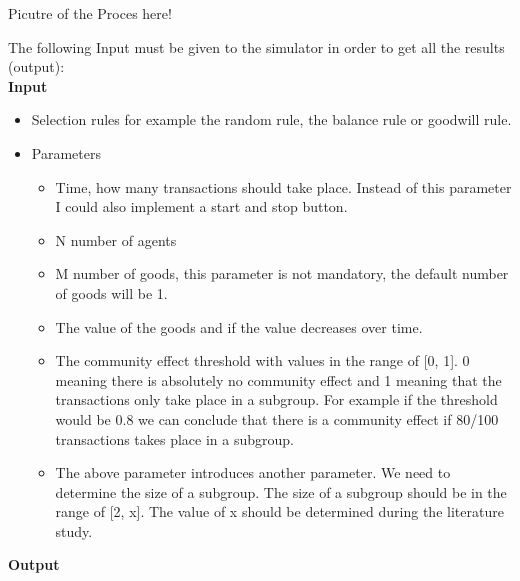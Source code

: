 \documentclass{article}
\begin{document}
Picutre of the Proces here!


The following Input must be given to the simulator in order to get all the results (output): 
\\
\textbf{Input}

\begin{itemize}
  \item Selection rules for example the random rule, the balance rule or goodwill rule.
  \item Parameters
	\begin{itemize}
 		 \item Time, how many transactions should take place. Instead of this parameter I could also implement a start and stop button.
  		\item N number of agents
  		\item M number of goods, this parameter is not mandatory, the default number of goods will be 1.
		\item The value of the goods and if the value decreases over time.
		\item The community effect threshold with values in the range of [0, 1]. 0 meaning there is absolutely no community effect and 1 meaning that the transactions only take place in a subgroup. For example if the threshold would be 0.8 we can conclude that there is a community effect if 80/100 transactions takes place in a subgroup.
		\item The above parameter introduces another parameter. We need to determine the size of a subgroup. The size of a subgroup should be in the range of [2, x]. The value of x should be determined during the literature study.
	\end{itemize} 
\end{itemize}

\textbf{Output}
\end{document}
